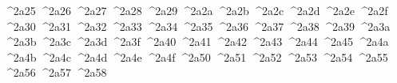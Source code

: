 {  ^^^^2a25%
  ^^^^2a26%
  ^^^^2a27%
  ^^^^2a28%
  ^^^^2a29%
  ^^^^2a2a%
  ^^^^2a2b%
  ^^^^2a2c%
  ^^^^2a2d%
  ^^^^2a2e%
  ^^^^2a2f%
  ^^^^2a30%
  ^^^^2a31%
  ^^^^2a32%
  ^^^^2a33%
  ^^^^2a34%
  ^^^^2a35%
  ^^^^2a36%
  ^^^^2a37%
  ^^^^2a38%
  ^^^^2a39%
  ^^^^2a3a%
  ^^^^2a3b%
  ^^^^2a3c%
  ^^^^2a3d%
  ^^^^2a3f%
  ^^^^2a40%
  ^^^^2a41%
  ^^^^2a42%
  ^^^^2a43%
  ^^^^2a44%
  ^^^^2a45%
  ^^^^2a4a%
  ^^^^2a4b%
  ^^^^2a4c%
  ^^^^2a4d%
  ^^^^2a4e%
  ^^^^2a4f%
  ^^^^2a50%
  ^^^^2a51%
  ^^^^2a52%
  ^^^^2a53%
  ^^^^2a54%
  ^^^^2a55%
  ^^^^2a56%
  ^^^^2a57%
  ^^^^2a58%
}
